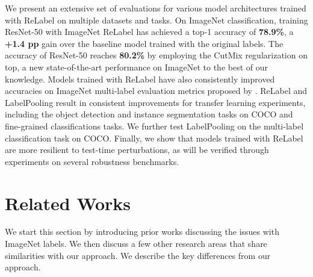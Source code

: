 \documentclass[final]{cvpr}
\newcommand\ours{{{\mbox{ReLabel}}}\xspace}
\newcommand\ourframework{{{LabelPooling}}\xspace}
\begin{document}
We present an extensive set of evaluations for various model architectures trained with \ours on multiple datasets and tasks. 
On ImageNet classification, training ResNet-50 with ImageNet \ours has achieved a top-1 accuracy of \textbf{78.9\%}, a \textbf{+1.4 pp} gain over the baseline model trained with the original labels. The accuracy of ResNet-50 reaches \textbf{80.2\%} by employing the CutMix regularization on top, a new state-of-the-art performance on ImageNet to the best of our knowledge. 
Models trained with \ours have also consistently improved accuracies on ImageNet multi-label evaluation metrics proposed by \cite{beyer2020are_we_done,shanker2020machine_accuracy}.
\ours and \ourframework result in consistent improvements for transfer learning experiments, including the object detection and instance segmentation tasks on COCO and fine-grained classifications tasks. 
We further test {\ourframework} on the multi-label classification task on COCO. 
Finally, we show that models trained with \ours are more resilient to test-time perturbations, as will be verified through experiments on several robustness benchmarks. 


 \section{Related Works}

We start this section by introducing prior works discussing the issues with ImageNet labels. We then discuss a few other research areas that share similarities with our approach. We describe the key differences from our approach.
\end{document}
